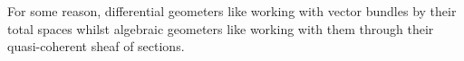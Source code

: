\documentclass[./main.tex]{subfiles}
\begin{document}
	



For some reason, differential geometers like working with vector bundles
by their total spaces whilst algebraic geometers like working with them 
through their quasi-coherent sheaf of sections.
\end{document}
